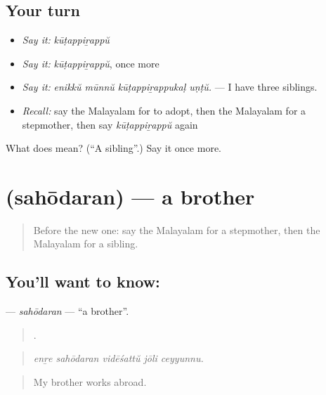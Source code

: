 \subsection*{Your turn}
\begin{itemize}
\raggedright
  \item \emph{Say it:} \emph{kūṭappiṟappŭ}
  \item \emph{Say it:} \emph{kūṭappiṟappŭ}, once more
  \item \emph{Say it:} \emph{enikkŭ mūnnŭ kūṭappiṟappukaḷ uṇṭŭ.} — I have three siblings.
  \item \emph{Recall:} say the Malayalam for to adopt, then the Malayalam for a stepmother, then say \emph{kūṭappiṟappŭ} again
\end{itemize}

\begin{tcolorbox}[breakable,colback=teal!4,colframe=teal!35!black,title={Before you move on}]
What does  mean? (\textquotedblleft{}A sibling\textquotedblright{}.) Say it once more.
\end{tcolorbox}
\section[\texorpdfstring{\ml{സഹോദരൻ} (sahōdaran)}{സഹോദരൻ (sahōdaran)}]{ (sahōdaran) — a brother}

\label{lesson:ML-C553-sahodaran}



\begin{quote}
Before the new one: say the Malayalam for a stepmother, then the Malayalam for a sibling.
\end{quote}

\subsection*{You'll want to know: }
\textbf{} — \emph{sahōdaran} — \textquotedblleft{}a brother\textquotedblright{}.

\begin{quote}
    .
\end{quote}

\begin{quote}
\emph{enṟe sahōdaran vidēśattŭ jōli ceyyunnu.}
\end{quote}

\begin{quote}
My brother works abroad.
\end{quote}

